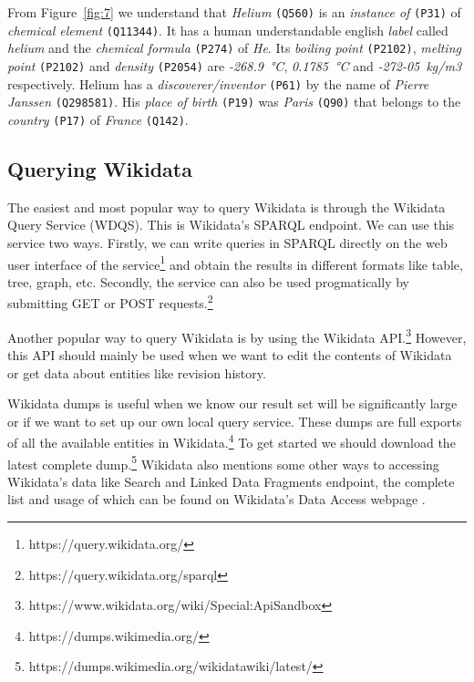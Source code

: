 From Figure~\ref{fig:7} we understand that \textit{Helium} \texttt{(\gls{Q560})} is an \textit{instance of} \texttt{(P31)} of \textit{chemical element} \texttt{(Q11344)}. It has a human understandable english \textit{label} called \textit{helium} and the \textit{chemical formula} \texttt{(P274)} of \textit{He}. Its \textit{boiling point} \texttt{(P2102)}, \textit{melting point} \texttt{(P2102)} and \textit{density} \texttt{(P2054)} are \textit{-268.9~°C}, \textit{0.1785~°C} and \textit{-272-05~kg/m3} respectively. Helium has a \textit{discoverer/inventor} \texttt{(P61)} by the name of \textit{Pierre Janssen} \texttt{(Q298581)}. His \textit{place of birth} \texttt{(P19)} was \textit{Paris} \texttt{(Q90)} that belongs to the \textit{country} \texttt{(P17)} of \textit{France} \texttt{(Q142)}.

\subsection{Querying Wikidata}

The easiest and most popular way to query Wikidata is through the Wikidata Query Service (WDQS). This is Wikidata's SPARQL endpoint. We can use this service two ways. Firstly, we can write queries in SPARQL directly on the web user interface of the service\footnote{https://query.wikidata.org/} and obtain the results in different formats like table, tree, graph, etc. Secondly, the service can also be used progmatically by submitting GET or POST requests.\footnote{https://query.wikidata.org/sparql}

Another popular way to query Wikidata is by using the Wikidata API.\footnote{https://www.wikidata.org/wiki/Special:ApiSandbox} However, this API should mainly be used when we want to edit the contents of Wikidata or get data about entities like revision history.

Wikidata dumps is useful when we know our result set will be significantly large or if we want to set up our own local query service. These dumps are full exports of all the available entities in Wikidata.\footnote{https://dumps.wikimedia.org/} To get started we should download the latest complete dump.\footnote{https://dumps.wikimedia.org/wikidatawiki/latest/} Wikidata also mentions some other ways to accessing Wikidata's data like Search and Linked Data Fragments endpoint, the complete list and usage of which can be found on Wikidata's Data Access webpage \cite{Wikidata2022}.




